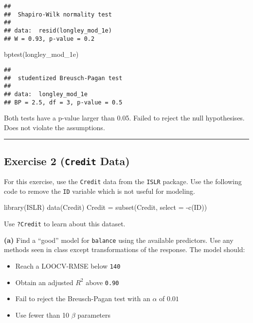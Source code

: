 \documentclass[
]{article}
\newenvironment{Shaded}{\begin{snugshade}}{\end{snugshade}}
\newcommand{\AttributeTok}[1]{\textcolor[rgb]{0.77,0.63,0.00}{#1}}
\newcommand{\FunctionTok}[1]{\textcolor[rgb]{0.00,0.00,0.00}{#1}}
\newcommand{\NormalTok}[1]{#1}
\newcommand{\OtherTok}[1]{\textcolor[rgb]{0.56,0.35,0.01}{#1}}
\newcommand{\SpecialCharTok}[1]{\textcolor[rgb]{0.00,0.00,0.00}{#1}}
\providecommand{\tightlist}{%
  \setlength{\itemsep}{0pt}\setlength{\parskip}{0pt}}
\begin{document}
\begin{verbatim}
## 
##  Shapiro-Wilk normality test
## 
## data:  resid(longley_mod_1e)
## W = 0.93, p-value = 0.2
\end{verbatim}

\begin{Shaded}
\begin{Highlighting}[]
\FunctionTok{bptest}\NormalTok{(longley\_mod\_1e)}
\end{Highlighting}
\end{Shaded}

\begin{verbatim}
## 
##  studentized Breusch-Pagan test
## 
## data:  longley_mod_1e
## BP = 2.5, df = 3, p-value = 0.5
\end{verbatim}

Both tests have a p-value larger than 0.05. Failed to reject the null
hypothesises. Does not violate the assumptions.

\begin{center}\rule{0.5\linewidth}{0.5pt}\end{center}

\hypertarget{exercise-2-credit-data}{%
\subsection{\texorpdfstring{Exercise 2 (\texttt{Credit}
Data)}{Exercise 2 (Credit Data)}}\label{exercise-2-credit-data}}

For this exercise, use the \texttt{Credit} data from the \texttt{ISLR}
package. Use the following code to remove the \texttt{ID} variable which
is not useful for modeling.

\begin{Shaded}
\begin{Highlighting}[]
\FunctionTok{library}\NormalTok{(ISLR)}
\FunctionTok{data}\NormalTok{(Credit)}
\NormalTok{Credit }\OtherTok{=} \FunctionTok{subset}\NormalTok{(Credit, }\AttributeTok{select =} \SpecialCharTok{{-}}\FunctionTok{c}\NormalTok{(ID))}
\end{Highlighting}
\end{Shaded}

Use \texttt{?Credit} to learn about this dataset.

\textbf{(a)} Find a ``good'' model for \texttt{balance} using the
available predictors. Use any methods seen in class except
transformations of the response. The model should:

\begin{itemize}
\tightlist
\item
  Reach a LOOCV-RMSE below \texttt{140}
\item
  Obtain an adjusted \(R^2\) above \texttt{0.90}
\item
  Fail to reject the Breusch-Pagan test with an \(\alpha\) of \(0.01\)
\item
  Use fewer than 10 \(\beta\) parameters
\end{itemize}
\end{document}

